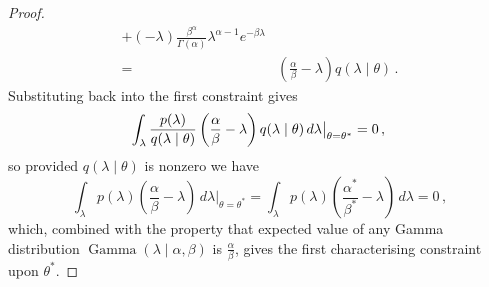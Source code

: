 \documentclass[twoside, 11pt]{article}
\DeclareMathOperator*{\gammad}{Gamma}
\begin{document}
\begin{proof}
\begin{align}
+ 
(-\lambda) \frac{\beta^{\alpha}}{\Gamma(\alpha)} \lambda^{\alpha-1} e^{-\beta \lambda}
\\
= & \left( \frac{\alpha}{\beta} - \lambda \right) q(\lambda \mid \theta) \, .
\end{align}
Substituting back into the first constraint gives
\begin{equation}
\int_{\lambda}
\frac{p(\lambda)}{q(\lambda \mid \theta)}
\left( \frac{\alpha}{\beta} - \lambda \right) q(\lambda \mid \theta)
\, d\lambda \bigr \vert_{\theta=\theta^*} = 0 \, , \\
\end{equation}
so provided $q(\lambda \mid \theta)$ is nonzero we have
\begin{equation}
\int_{\lambda}
p(\lambda)
\left( \frac{\alpha}{\beta} - \lambda \right)
\, d\lambda \bigr \vert_{\theta=\theta^*} =
\int_{\lambda}
p(\lambda)
\left( \frac{\alpha^{*}}{\beta^{*}} - \lambda \right)
\, d\lambda =
0 \, ,
\end{equation}
which, combined with the property that expected value of any Gamma distribution $\gammad(\lambda \mid \alpha, \beta)$ is $\frac{\alpha}{\beta}$, gives the first characterising constraint upon $\theta^{*}$.


\end{proof}
\end{document}
